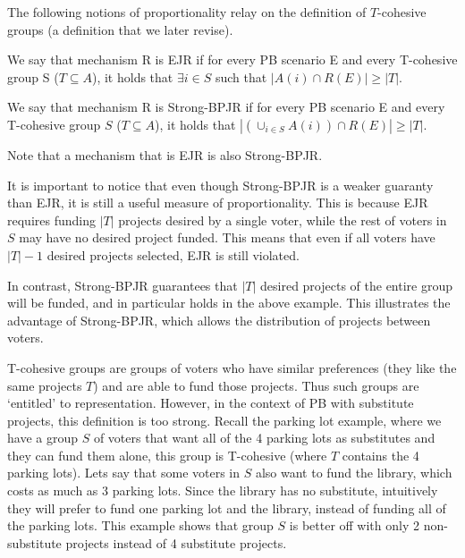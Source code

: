 \documentclass[runningheads]{llncs}
\begin{document}
The following notions of proportionality relay on the definition of $T$-cohesive groups (a definition that we later revise). 

\begin{definition}  We say that mechanism R is EJR if for every PB scenario E and every T-cohesive group S ($T\subseteq A$), it holds that $\exists i\in S $ such that $|A(i)\cap R(E)|\geq |T|$.
\end{definition}

\begin{definition}
 We say that mechanism R is Strong-BPJR if for every PB scenario E and every T-cohesive group $S$ ($T\subseteq A$), it holds that  $|(\cup_{i\in S}A(i))\cap R(E)|\geq |T|$. 
\end{definition}
Note  that a mechanism that is  EJR is also Strong-BPJR. 

It is important to notice that  even though Strong-BPJR is a weaker guaranty than EJR, it is still a useful measure of proportionality. This is because  EJR requires funding $|T|$ projects desired by a single voter, while the rest of voters in $S$ may have no desired project funded.
This means that even if all voters have $|T|-1$ desired projects selected, EJR is still violated.

In contrast, Strong-BPJR guarantees that $|T|$ desired projects of the entire group will be funded, and in particular holds in the above example. 
 This illustrates the advantage of Strong-BPJR, which allows the distribution of projects between voters.

  T-cohesive groups  are  groups of voters who have similar preferences (they like the same projects $T$) and are able to  fund those projects. Thus such groups are `entitled' to representation.
However, in the context of PB with substitute projects, this definition is too strong. Recall the parking lot example, where we have a group $S$ of voters that want all of the 4 parking lots as substitutes and they can fund them alone, this group is T-cohesive (where $T$ contains the 4 parking lots). Lets say that some voters in $S$ also want to fund the library, which costs as much as 3 parking lots. Since the library has no  substitute, intuitively they will prefer to fund one parking lot and the library, instead of funding all of the parking lots.
This example shows that group $S$ is better off with only 2 non-substitute projects instead of 4 substitute projects.
\end{document}
